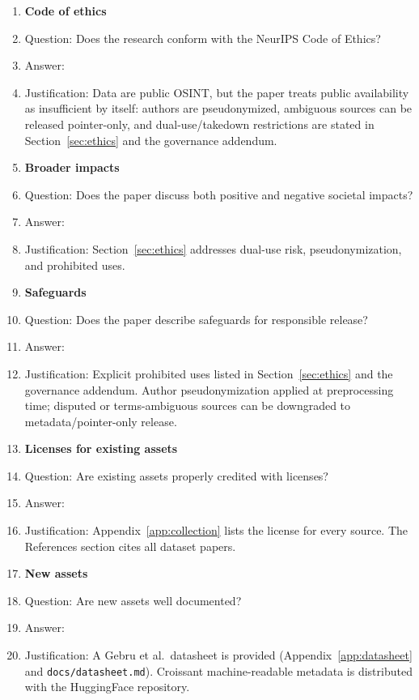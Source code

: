 \documentclass{article}
\begin{document}
\begin{enumerate}
\item {\bf Code of ethics}
    \item[] Question: Does the research conform with the NeurIPS Code of Ethics?
    \item[] Answer: \answerYes{}
    \item[] Justification: Data are public OSINT, but the paper treats public availability as insufficient by itself: authors are pseudonymized, ambiguous sources can be released pointer-only, and dual-use/takedown restrictions are stated in Section~\ref{sec:ethics} and the governance addendum.

\item {\bf Broader impacts}
    \item[] Question: Does the paper discuss both positive and negative societal impacts?
    \item[] Answer: \answerYes{}
    \item[] Justification: Section~\ref{sec:ethics} addresses dual-use risk, pseudonymization, and prohibited uses.

\item {\bf Safeguards}
    \item[] Question: Does the paper describe safeguards for responsible release?
    \item[] Answer: \answerYes{}
    \item[] Justification: Explicit prohibited uses listed in Section~\ref{sec:ethics} and the governance addendum. Author pseudonymization applied at preprocessing time; disputed or terms-ambiguous sources can be downgraded to metadata/pointer-only release.

\item {\bf Licenses for existing assets}
    \item[] Question: Are existing assets properly credited with licenses?
    \item[] Answer: \answerYes{}
    \item[] Justification: Appendix~\ref{app:collection} lists the license for every source. The References section cites all dataset papers.

\item {\bf New assets}
    \item[] Question: Are new assets well documented?
    \item[] Answer: \answerYes{}
    \item[] Justification: A Gebru et al.\ datasheet is provided (Appendix~\ref{app:datasheet} and \texttt{docs/datasheet.md}). Croissant machine-readable metadata is distributed with the HuggingFace repository.


\end{enumerate}
\end{document}
